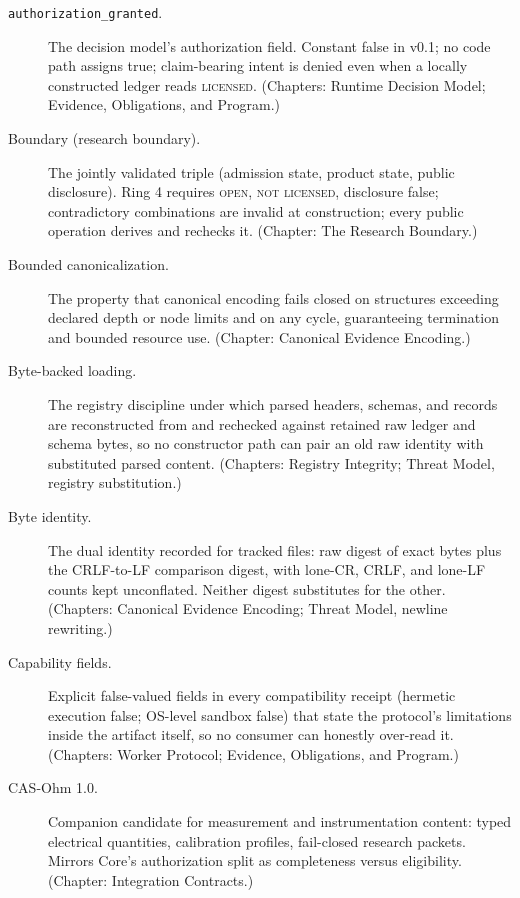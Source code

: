 \begin{description}
\item[\texttt{authorization\_granted}.] The decision model's authorization field. Constant false in v0.1; no code path assigns true; claim-bearing intent is denied even when a locally constructed ledger reads \textsc{licensed}. (Chapters: Runtime Decision Model; Evidence, Obligations, and Program.)

\item[Boundary (research boundary).] The jointly validated triple (admission state, product state, public disclosure). Ring 4 requires \textsc{open}, \textsc{not licensed}, disclosure false; contradictory combinations are invalid at construction; every public operation derives and rechecks it. (Chapter: The Research Boundary.)

\item[Bounded canonicalization.] The property that canonical encoding fails closed on structures exceeding declared depth or node limits and on any cycle, guaranteeing termination and bounded resource use. (Chapter: Canonical Evidence Encoding.)

\item[Byte-backed loading.] The registry discipline under which parsed headers, schemas, and records are reconstructed from and rechecked against retained raw ledger and schema bytes, so no constructor path can pair an old raw identity with substituted parsed content. (Chapters: Registry Integrity; Threat Model, registry substitution.)

\item[Byte identity.] The dual identity recorded for tracked files: raw digest of exact bytes plus the CRLF-to-LF comparison digest, with lone-CR, CRLF, and lone-LF counts kept unconflated. Neither digest substitutes for the other. (Chapters: Canonical Evidence Encoding; Threat Model, newline rewriting.)

\item[Capability fields.] Explicit false-valued fields in every compatibility receipt (hermetic execution false; OS-level sandbox false) that state the protocol's limitations inside the artifact itself, so no consumer can honestly over-read it. (Chapters: Worker Protocol; Evidence, Obligations, and Program.)

\item[CAS-Ohm 1.0.] Companion candidate for measurement and instrumentation content: typed electrical quantities, calibration profiles, fail-closed research packets. Mirrors Core's authorization split as completeness versus eligibility. (Chapter: Integration Contracts.)


\end{description}
